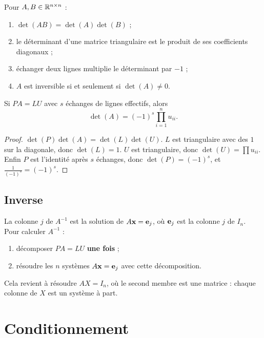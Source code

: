 \begin{proposition}
Pour $A, B \in \mathbb{R}^{n \times n}$ :
\begin{enumerate}
    \item $\det(AB) = \det(A) \det(B)$ ;
    \item le déterminant d'une matrice triangulaire est
          le produit de ses coefficients diagonaux ;
    \item échanger deux lignes multiplie le
          déterminant par $-1$ ;
    \item $A$ est inversible si et seulement si
          $\det(A) \neq 0$.
\end{enumerate}
\end{proposition}

\begin{proposition}
Si $PA = LU$ avec $s$ échanges de lignes effectifs,
alors
\[
    \det(A) = (-1)^s \prod_{i=1}^{n} u_{ii}.
\]
\end{proposition}

\begin{proof}
$\det(P)\det(A) = \det(L)\det(U)$. $L$ est
triangulaire avec des $1$ sur la diagonale, donc
$\det(L) = 1$. $U$ est triangulaire, donc
$\det(U) = \prod u_{ii}$. Enfin $P$ est l'identité
après $s$ échanges, donc $\det(P) = (-1)^s$, et
$\frac{1}{(-1)^s} = (-1)^s$.
\end{proof}

\subsection{Inverse}

\begin{methodbox}
La colonne $j$ de $A^{-1}$ est la solution de
$A\mathbf{x} = \mathbf{e}_j$, où $\mathbf{e}_j$ est la
colonne $j$ de $I_n$. Pour calculer $A^{-1}$ :
\begin{enumerate}
    \item décomposer $PA = LU$ \textbf{une fois} ;
    \item résoudre les $n$ systèmes
          $A\mathbf{x} = \mathbf{e}_j$ avec cette
          décomposition.
\end{enumerate}
Cela revient à résoudre $AX = I_n$, où le second
membre est une matrice : chaque colonne de $X$ est
un système à part.
\end{methodbox}

\section{Conditionnement}

